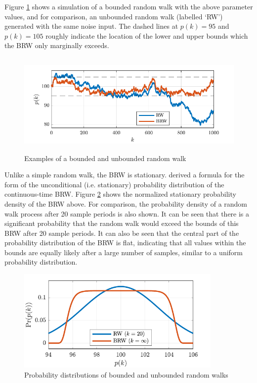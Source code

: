 Figure \ref{fig:brw-sim} shows a simulation of a bounded random walk with the above parameter values, and for comparison, an unbounded random walk (labelled `RW') generated with the same noise input. The dashed lines at $p(k)=95$ and $p(k)=105$ roughly indicate the location of the lower and upper bounds which the BRW only marginally exceeds.

\begin{figure}[ht]
	\centering
	\includegraphics[height=5cm]{images/brw_sim.pdf}
	\caption{Examples of a bounded and unbounded random walk}
	\label{fig:brw-sim}
\end{figure}

Unlike a simple random walk, the \gls{BRW} is stationary. \cite{nicolau_stationary_2002} derived a formula for the form of the unconditional (i.e. stationary) probability distribution of the continuous-time \gls{BRW}. Figure \ref{fig:brw-pdf} shows the normalized stationary probability density of the \gls{BRW} above. For comparison, the probability density of a random walk process after 20 sample periods is also shown. It can be seen that there is a significant probability that the random walk would exceed the bounds of this \gls{BRW} after 20 sample periods. It can also be seen that the central part of the probability distribution of the \gls{BRW} is flat, indicating that all values within the bounds are equally likely after a large number of samples, similar to a uniform probability distribution.


\begin{figure}[ht]
	\centering
	\includegraphics[height=5cm]{images/brw_pdf.pdf}
	\caption{Probability distributions of bounded and unbounded random walks}
	\label{fig:brw-pdf}
\end{figure}

